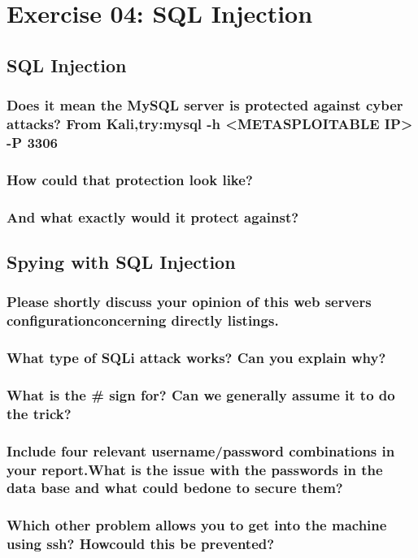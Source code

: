 \section{Exercise 04: SQL Injection}

\subsection{SQL Injection}
\subsubsection{Does it mean the MySQL server is protected against cyber attacks? From Kali,try:mysql -h <METASPLOITABLE IP> -P 3306}
\subsubsection{How could that protection look like?}
\subsubsection{And what exactly would it protect against?}

\subsection{Spying with SQL Injection}
\subsubsection{Please shortly discuss your opinion of this web servers configurationconcerning directly listings.}
\subsubsection{What type of SQLi attack works? Can you explain why?}
\subsubsection{What is the \# sign for? Can we generally assume it to do the trick?}
\subsubsection{Include four relevant username/password combinations in your report.What is the issue with the passwords in the data base and what could bedone to secure them?}
\subsubsection{Which other problem allows you to get into the machine using ssh? Howcould this be prevented?}

